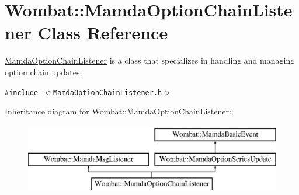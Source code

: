 \hypertarget{classWombat_1_1MamdaOptionChainListener}{
\section{Wombat::Mamda\-Option\-Chain\-Listener Class Reference}
\label{classWombat_1_1MamdaOptionChainListener}
}
\hyperlink{classWombat_1_1MamdaOptionChainListener}{Mamda\-Option\-Chain\-Listener} is a class that specializes in handling and managing option chain updates.  


{\tt \#include $<$Mamda\-Option\-Chain\-Listener.h$>$}

Inheritance diagram for Wombat::Mamda\-Option\-Chain\-Listener::\begin{figure}[H]
\begin{center}
\leavevmode
\includegraphics[height=3cm]{classWombat_1_1MamdaOptionChainListener}
\end{center}
\end{figure}
